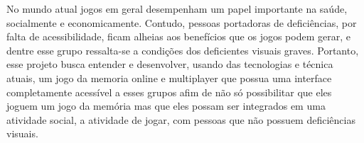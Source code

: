 
No mundo atual jogos em geral desempenham um papel importante na saúde, socialmente e economicamente. Contudo, pessoas portadoras de deficiências, por falta de acessibilidade, ficam alheias aos benefícios que os jogos podem gerar, e dentre esse grupo ressalta-se a condições dos deficientes visuais graves. Portanto, esse projeto busca entender e desenvolver, usando das tecnologias e técnica atuais, um jogo da memoria online e multiplayer que possua uma interface completamente acessível a esses grupos afim de não só possibilitar que eles joguem um jogo da memória mas que eles possam ser integrados em uma atividade social, a atividade de jogar, com pessoas que não possuem deficiências visuais.  

